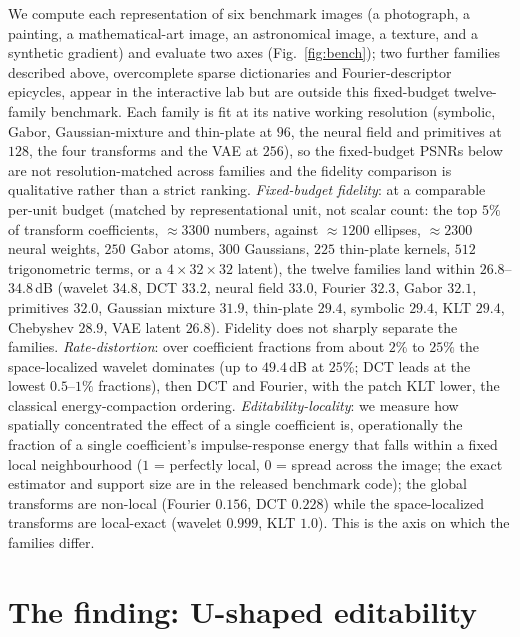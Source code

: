 \documentclass[journal]{IEEEtran}
\begin{document}
We compute each representation of six benchmark images (a photograph, a painting, a mathematical-art
image, an astronomical image, a texture, and a synthetic gradient) and evaluate two axes
(Fig.~\ref{fig:bench}); two further families described above, overcomplete sparse dictionaries and
Fourier-descriptor epicycles, appear in the interactive lab but are outside this fixed-budget
twelve-family benchmark. Each family is fit at its native working resolution (symbolic, Gabor,
Gaussian-mixture and thin-plate at $96$, the neural field and primitives at $128$, the four
transforms and the VAE at $256$), so the fixed-budget PSNRs below are not resolution-matched across
families and the fidelity comparison is qualitative rather than a strict ranking.
\emph{Fixed-budget fidelity}: at a comparable per-unit budget (matched by representational unit, not
scalar count: the top $5\%$ of transform coefficients, $\approx3300$ numbers, against $\approx1200$
ellipses, $\approx2300$ neural weights, $250$ Gabor atoms, $300$ Gaussians, $225$
thin-plate kernels, $512$ trigonometric terms, or a $4\times32\times32$ latent), the twelve families
land within $26.8$--$34.8$\,dB (wavelet $34.8$, DCT $33.2$, neural field $33.0$, Fourier $32.3$, Gabor
$32.1$, primitives $32.0$, Gaussian mixture $31.9$, thin-plate $29.4$, symbolic $29.4$, KLT $29.4$,
Chebyshev $28.9$, VAE latent $26.8$). Fidelity does not sharply separate the families. \emph{Rate-distortion}:
over coefficient fractions from about $2\%$ to $25\%$ the space-localized wavelet dominates (up to
$49.4$\,dB at $25\%$; DCT leads at the lowest $0.5$--$1\%$ fractions), then DCT and Fourier, with the
patch KLT lower, the classical energy-compaction ordering. \emph{Editability-locality}: we measure how spatially concentrated the effect of a single
coefficient is, operationally the fraction of a single coefficient's impulse-response energy that
falls within a fixed local neighbourhood ($1$ = perfectly local, $0$ = spread across the image; the
exact estimator and support size are in the released benchmark code); the global transforms are non-local (Fourier $0.156$, DCT $0.228$) while the
space-localized transforms are local-exact (wavelet $0.999$, KLT $1.0$). This is the axis on which the
families differ.

\section{The finding: U-shaped editability}
\label{sec:finding}
\end{document}
